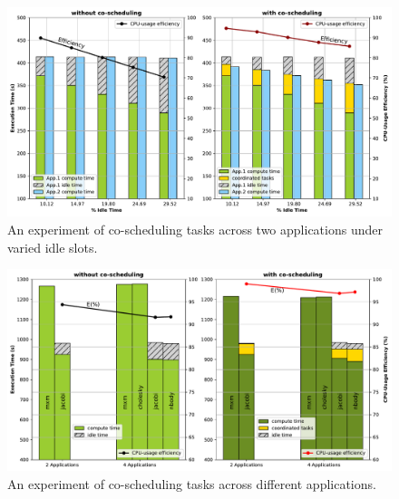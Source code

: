 \begin{figure}[t]
  \centering
  \includegraphics[scale=0.45]{./pictures/evaluation/eval_coschedule_2apps_varied_idles.pdf}
	\caption{An experiment of co-scheduling tasks across two applications under varied idle slots.}
	\label{fig:eval_coschedule_varied_idles}
\end{figure}

\begin{figure}[t]
  \centering
  \includegraphics[scale=0.425]{./pictures/evaluation/eval_coschedule_multi_apps.pdf}
	\caption{An experiment of co-scheduling tasks across different applications.}
	\label{fig:eval_coschedule_multi_apps}
\end{figure}

